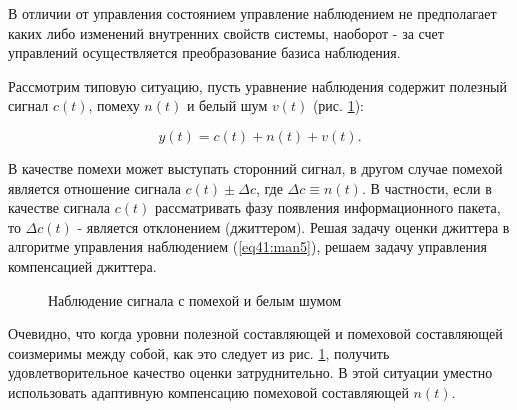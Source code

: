 В отличии от управления состоянием управление наблюдением не предполагает каких либо изменений внутренних свойств системы, наоборот - за счет управлений осуществляется преобразование базиса наблюдения.

Рассмотрим типовую ситуацию, пусть уравнение наблюдения содержит полезный сигнал $c(t)$, помеху $n(t)$ и белый шум $v(t)$ (рис. \ref{fig:man_1}):

\begin{equation}\label{eq41:man7}
y(t)=c(t)+n(t)+v(t).
\end{equation}

В качестве помехи может выступать сторонний сигнал, в другом случае помехой является отношение сигнала $c(t)\pm \Delta c$, где $\Delta c\equiv n(t)$. 
В частности, если в качестве сигнала $c(t)$ рассматривать фазу появления информационного пакета, то $\Delta c(t)$ - является отклонением (джиттером).
Решая задачу оценки джиттера в алгоритме управления наблюдением (\ref{eq41:man5}), решаем задачу управления компенсацией джиттера.

\begin{figure}[!h]

\centering
{} 
\caption{Наблюдение сигнала с помехой и белым шумом}
\label{fig:man_1}
\end{figure}


Очевидно, что когда уровни полезной составляющей и помеховой составляющей соизмеримы между собой, как это следует из рис. \ref{fig:man_1}, получить удовлетворительное качество оценки затруднительно. 
В этой ситуации уместно использовать адаптивную компенсацию помеховой составляющей $n(t)$.

